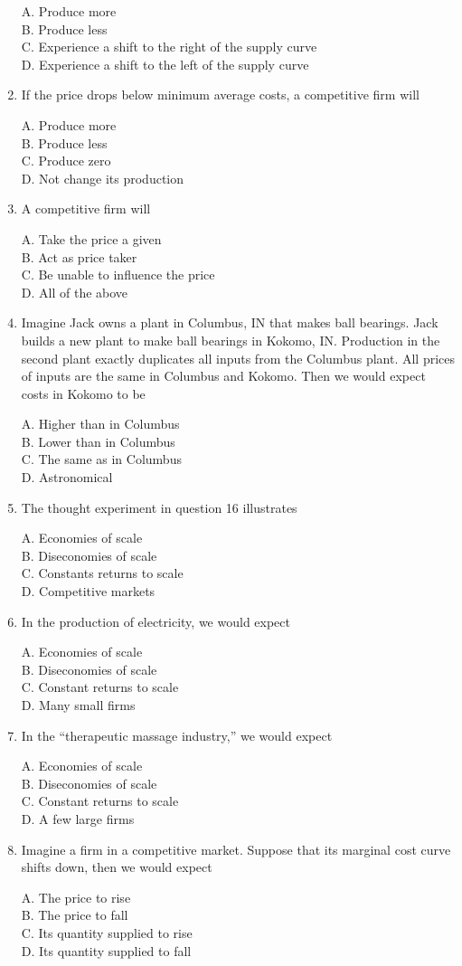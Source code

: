 \documentclass[
]{book}
\begin{document}
\begin{enumerate}
  A. Produce more\\
  B. Produce less\\
  C. Experience a shift to the right of the supply curve\\
  D. Experience a shift to the left of the supply curve
\item
  If the price drops below minimum average costs, a competitive firm will

  A. Produce more\\
  B. Produce less\\
  C. Produce zero\\
  D. Not change its production
\item
  A competitive firm will

  A. Take the price a given\\
  B. Act as price taker\\
  C. Be unable to influence the price\\
  D. All of the above
\item
  Imagine Jack owns a plant in Columbus, IN that makes ball bearings. Jack builds a new plant to make ball bearings in Kokomo, IN. Production in the second plant exactly duplicates all inputs from the Columbus plant. All prices of inputs are the same in Columbus and Kokomo. Then we would expect costs in Kokomo to be

  A. Higher than in Columbus\\
  B. Lower than in Columbus\\
  C. The same as in Columbus\\
  D. Astronomical
\item
  The thought experiment in question 16 illustrates

  A. Economies of scale\\
  B. Diseconomies of scale\\
  C. Constants returns to scale\\
  D. Competitive markets
\item
  In the production of electricity, we would expect

  A. Economies of scale\\
  B. Diseconomies of scale\\
  C. Constant returns to scale\\
  D. Many small firms
\item
  In the ``therapeutic massage industry,'' we would expect

  A. Economies of scale\\
  B. Diseconomies of scale\\
  C. Constant returns to scale\\
  D. A few large firms
\item
  Imagine a firm in a competitive market. Suppose that its marginal cost curve shifts down, then we would expect

  A. The price to rise\\
  B. The price to fall\\
  C. Its quantity supplied to rise\\
  D. Its quantity supplied to fall
\end{enumerate}
\end{document}
